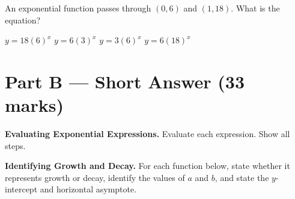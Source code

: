 \documentclass[addpoints]{exam}
\begin{document}
\begin{questions}
\question[1]
An exponential function passes through $(0, 6)$ and $(1, 18)$. What is the equation?
\begin{choices}
    \choice $y = 18(6)^x$
    \correctchoice $y = 6(3)^x$
    \choice $y = 3(6)^x$
    \choice $y = 6(18)^x$
\end{choices}

\section*{Part B --- Short Answer (33 marks)}

\question[6]
\textbf{Evaluating Exponential Expressions.} Evaluate each expression. Show all steps.


\question[6]
\textbf{Identifying Growth and Decay.} For each function below, state whether it represents growth or decay, identify the values of $a$ and $b$, and state the $y$-intercept and horizontal asymptote.

\begin{parts}

\end{parts}
\end{questions}
\end{document}
